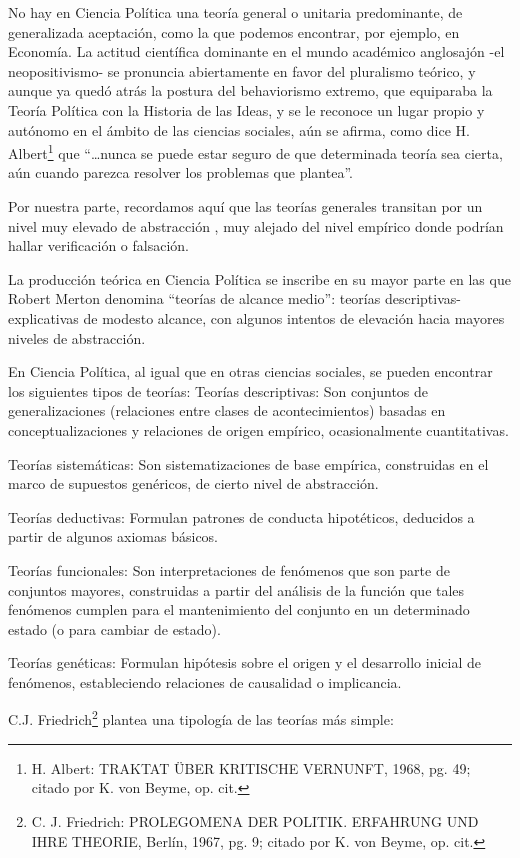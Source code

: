 \documentclass[
]{book}
\begin{document}
No hay en Ciencia Política una teoría general o unitaria predominante, de generalizada aceptación, como la que podemos encontrar, por ejemplo, en Economía. La actitud científica dominante en el mundo académico anglosajón -el neopositivismo- se pronuncia abiertamente en favor del pluralismo teórico, y aunque ya quedó atrás la postura del behaviorismo extremo, que equiparaba la Teoría Política con la Historia de las Ideas, y se le reconoce un lugar propio y autónomo en el ámbito de las ciencias sociales, aún se afirma, como dice H. Albert\footnote{H. Albert: TRAKTAT ÜBER KRITISCHE VERNUNFT, 1968, pg. 49; citado por K. von Beyme, op. cit.} que ``\ldots nunca se puede estar seguro de que determinada teoría sea cierta, aún cuando parezca resolver los problemas que plantea''.

Por nuestra parte, recordamos aquí que las teorías generales transitan por un nivel muy elevado de abstracción , muy alejado del nivel empírico donde podrían hallar verificación o falsación.

La producción teórica en Ciencia Política se inscribe en su mayor parte en las que Robert Merton denomina ``teorías de alcance medio'': teorías descriptivas-explicativas de modesto alcance, con algunos intentos de elevación hacia mayores niveles de abstracción.

En Ciencia Política, al igual que en otras ciencias sociales, se pueden encontrar los siguientes tipos de teorías: Teorías descriptivas: Son conjuntos de generalizaciones (relaciones entre clases de acontecimientos) basadas en conceptualizaciones y relaciones de origen empírico, ocasionalmente cuantitativas.

Teorías sistemáticas: Son sistematizaciones de base empírica, construidas en el marco de supuestos genéricos, de cierto nivel de abstracción.

Teorías deductivas: Formulan patrones de conducta hipotéticos, deducidos a partir de algunos axiomas básicos.

Teorías funcionales: Son interpretaciones de fenómenos que son parte de conjuntos mayores, construidas a partir del análisis de la función que tales fenómenos cumplen para el mantenimiento del conjunto en un determinado estado (o para cambiar de estado).

Teorías genéticas: Formulan hipótesis sobre el origen y el desarrollo inicial de fenómenos, estableciendo relaciones de causalidad o implicancia.

C.J. Friedrich\footnote{ C. J. Friedrich: PROLEGOMENA DER POLITIK. ERFAHRUNG UND IHRE THEORIE, Berlín, 1967, pg. 9; citado por K. von Beyme, op. cit.} plantea una tipología de las teorías más simple:
\end{document}
